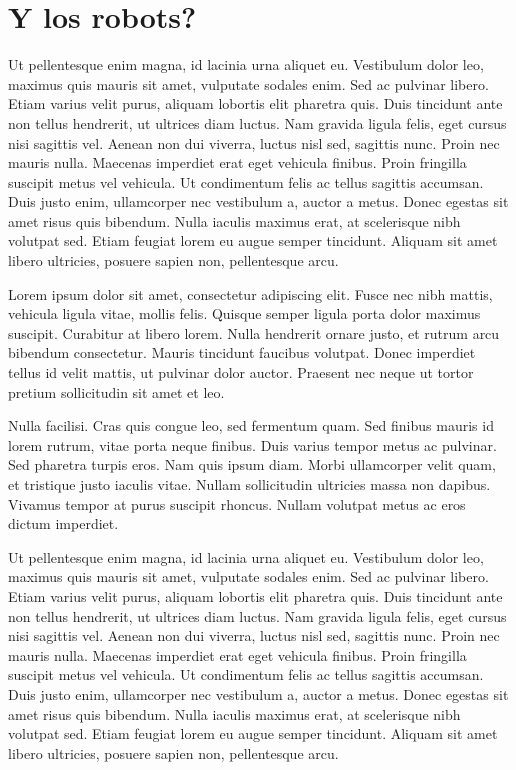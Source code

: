 \section{Y los robots?}

Ut pellentesque enim magna, id lacinia urna aliquet eu. Vestibulum dolor leo, maximus quis mauris sit amet, vulputate sodales enim. Sed ac pulvinar libero. Etiam varius velit purus, aliquam lobortis elit pharetra quis. Duis tincidunt ante non tellus hendrerit, ut ultrices diam luctus. Nam gravida ligula felis, eget cursus nisi sagittis vel. Aenean non dui viverra, luctus nisl sed, sagittis nunc. Proin nec mauris nulla. Maecenas imperdiet erat eget vehicula finibus. Proin fringilla suscipit metus vel vehicula. Ut condimentum felis ac tellus sagittis accumsan. Duis justo enim, ullamcorper nec vestibulum a, auctor a metus. Donec egestas sit amet risus quis bibendum. Nulla iaculis maximus erat, at scelerisque nibh volutpat sed. Etiam feugiat lorem eu augue semper tincidunt. Aliquam sit amet libero ultricies, posuere sapien non, pellentesque arcu.

Lorem ipsum dolor sit amet, consectetur adipiscing elit. Fusce nec nibh mattis, vehicula ligula vitae, mollis felis. Quisque semper ligula porta dolor maximus suscipit. Curabitur at libero lorem. Nulla hendrerit ornare justo, et rutrum arcu bibendum consectetur. Mauris tincidunt faucibus volutpat. Donec imperdiet tellus id velit mattis, ut pulvinar dolor auctor. Praesent nec neque ut tortor pretium sollicitudin sit amet et leo.

Nulla facilisi. Cras quis congue leo, sed fermentum quam. Sed finibus mauris id lorem rutrum, vitae porta neque finibus. Duis varius tempor metus ac pulvinar. Sed pharetra turpis eros. Nam quis ipsum diam. Morbi ullamcorper velit quam, et tristique justo iaculis vitae. Nullam sollicitudin ultricies massa non dapibus. Vivamus tempor at purus suscipit rhoncus. Nullam volutpat metus ac eros dictum imperdiet.

Ut pellentesque enim magna, id lacinia urna aliquet eu. Vestibulum dolor leo, maximus quis mauris sit amet, vulputate sodales enim. Sed ac pulvinar libero. Etiam varius velit purus, aliquam lobortis elit pharetra quis. Duis tincidunt ante non tellus hendrerit, ut ultrices diam luctus. Nam gravida ligula felis, eget cursus nisi sagittis vel. Aenean non dui viverra, luctus nisl sed, sagittis nunc. Proin nec mauris nulla. Maecenas imperdiet erat eget vehicula finibus. Proin fringilla suscipit metus vel vehicula. Ut condimentum felis ac tellus sagittis accumsan. Duis justo enim, ullamcorper nec vestibulum a, auctor a metus. Donec egestas sit amet risus quis bibendum. Nulla iaculis maximus erat, at scelerisque nibh volutpat sed. Etiam feugiat lorem eu augue semper tincidunt. Aliquam sit amet libero ultricies, posuere sapien non, pellentesque arcu.

